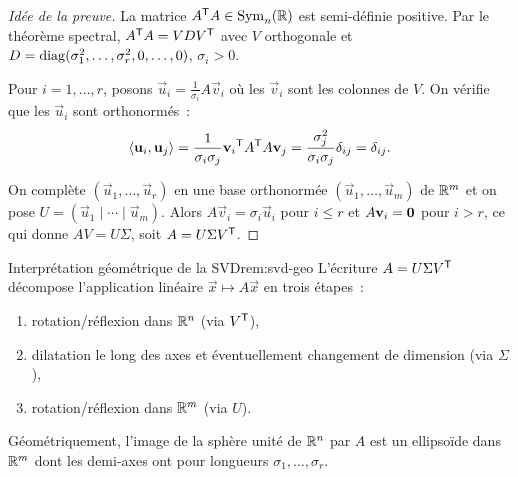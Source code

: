 \begin{proof}[Idée de la preuve]
  La matrice ${A}^{\mathsf{T}}A \in \operatorname{Sym}_n({\mathbb{R}})$ est semi-définie positive.
  Par le théorème spectral, ${A}^{\mathsf{T}}A = V D {V}^{\mathsf{T}}$ avec
  $V$ orthogonale et $D = \operatorname{diag}(\sigma_1^2, \ldots, \sigma_r^2,
  0, \ldots, 0)$, $\sigma_i > 0$.

  Pour $i = 1, \ldots, r$, posons $\vec{u}_i = \frac{1}{\sigma_i} A \vec{v}_i$
  où les $\vec{v}_i$ sont les colonnes de $V$. On vérifie que les
  $\vec{u}_i$ sont orthonormés~:
  \[
    \langle\mathbf{u}_i, \mathbf{u}_j\rangle
    = \frac{1}{\sigma_i \sigma_j} {\mathbf{v}_i}^{\mathsf{T}} {A}^{\mathsf{T}} A \mathbf{v}_j
    = \frac{\sigma_j^2}{\sigma_i \sigma_j} \delta_{ij}
    = \delta_{ij}.
  \]

  On complète $(\vec{u}_1, \ldots, \vec{u}_r)$ en une base orthonormée
  $(\vec{u}_1, \ldots, \vec{u}_m)$ de ${\mathbb{R}}^m$ et on pose
  $U = (\vec{u}_1 \mid \cdots \mid \vec{u}_m)$. Alors $A \vec{v}_i
  = \sigma_i \vec{u}_i$ pour $i \leq r$ et $A\mathbf{v}_i = \mathbf{0}$ pour
  $i > r$, ce qui donne $A V = U \Sigma$, soit $A = U \Sigma {V}^{\mathsf{T}}$.
\end{proof}

\begin{remark}{Interprétation géométrique de la SVD}{rem:svd-geo}
  L'écriture $A = U \Sigma {V}^{\mathsf{T}}$ décompose l'application
  linéaire $\vec{x} \mapsto A\vec{x}$ en trois étapes~:
  \begin{enumerate}[label=(\arabic*)]
    \item rotation/réflexion dans ${\mathbb{R}}^n$ (via ${V}^{\mathsf{T}}$),
    \item dilatation le long des axes et éventuellement changement de
      dimension (via $\Sigma$),
    \item rotation/réflexion dans ${\mathbb{R}}^m$ (via $U$).
  \end{enumerate}
  Géométriquement, l'image de la sphère unité de ${\mathbb{R}}^n$ par $A$ est un
  ellipsoïde dans ${\mathbb{R}}^m$ dont les demi-axes ont pour longueurs
  $\sigma_1, \ldots, \sigma_r$.
\end{remark}

